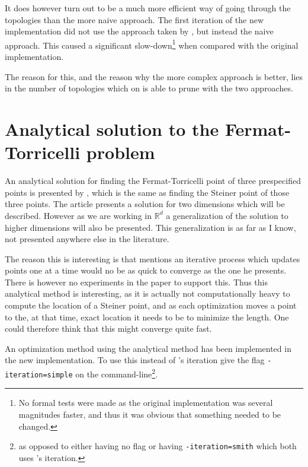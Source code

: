 It does however turn out to be a much more efficient way of going through the
topologies than the more naive approach. The first iteration of the new
implementation did not use the approach taken by \citeauthor{smith1992}, but
instead the naive approach. This caused a significant
slow-down\footnote{No formal tests were made as the original implementation was
  several magnitudes faster, and thus it was obvious that something needed to be
changed.} when compared with the original implementation.

The reason for this, and the reason why the more complex approach is better,
lies in the number of topologies which on is able to prune with the two
approaches.


\section{Analytical solution to the Fermat-Torricelli problem}
\label{sec:analyt-solut-ferm}

An analytical solution for finding the Fermat-Torricelli point of three
prespecified points is presented by \textcite{uteshev2014}, which is the same as
finding the Steiner point of those three points. The article presents a
solution for two dimensions which will be described. However as we are working
in $\mathbb{R}^d$ a generalization of the solution to higher dimensions will
also be presented. This generalization is as far as I know, not presented
anywhere else in the literature.

The reason this is interesting is that \textcite{smith1992} mentions an
iterative process which updates points one at a time would no be as quick to
converge as the one he presents. There is however no experiments in the paper to
support this. Thus this analytical method is interesting, as it is actually not
computationally heavy to compute the location of a Steiner point, and as
each optimization moves a point to the, at that time, exact location it needs to
be to minimize the length. One could therefore think that this might converge
quite fast.

An optimization method using the analytical method has been implemented in the
new implementation. To use this instead of \citeauthor{smith1992}'s iteration
give the flag \texttt{-iteration=simple} on the command-line\footnote{as opposed
  to either having no flag or having \texttt{-iteration=smith} which both uses
  \citeauthor{smith1992}'s iteration.}.

